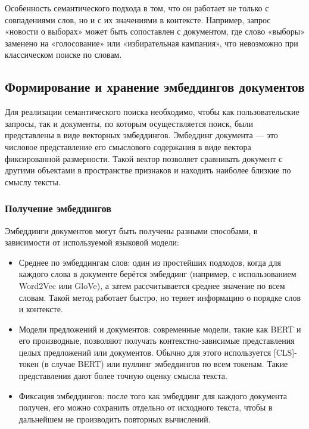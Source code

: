 \documentclass[coursework]{SCWorks}
\begin{document}
Особенность семантического подхода в том, что он работает не только с совпадениями слов, но и с их значениями в контексте. Например, запрос «новости о выборах» может быть сопоставлен с документом, где слово «выборы» заменено на «голосование» или «избирательная кампания», что невозможно при классическом поиске по словам.

\subsection{Формирование и хранение эмбеддингов документов}

Для реализации семантического поиска необходимо, чтобы как пользовательские запросы, так и документы, по которым осуществляется поиск, были представлены в виде векторных эмбеддингов. Эмбеддинг документа — это числовое представление его смыслового содержания в виде вектора фиксированной размерности. Такой вектор позволяет сравнивать документ с другими объектами в пространстве признаков и находить наиболее близкие по смыслу тексты.

\subsubsection{Получение эмбеддингов}
Эмбеддинги документов могут быть получены разными способами, в зависимости от используемой языковой модели:
\begin{itemize}
    \item 
    Среднее по эмбеддингам слов: один из простейших подходов, когда для каждого слова в документе берётся эмбеддинг (например, с использованием Word2Vec или GloVe), а затем рассчитывается среднее значение по всем словам. Такой метод работает быстро, но теряет информацию о порядке слов и контексте.
    
    \item Модели предложений и документов: современные модели, такие как BERT и его производные, позволяют получать контекстно-зависимые представления целых предложений или документов. Обычно для этого используется [CLS]-токен (в случае BERT) или пуллинг эмбеддингов по всем токенам. Такие представления дают более точную оценку смысла текста.
    
    \item Фиксация эмбеддингов: после того как эмбеддинг для каждого документа получен, его можно сохранить отдельно от исходного текста, чтобы в дальнейшем не производить повторных вычислений.
\end{itemize}
\end{document}
